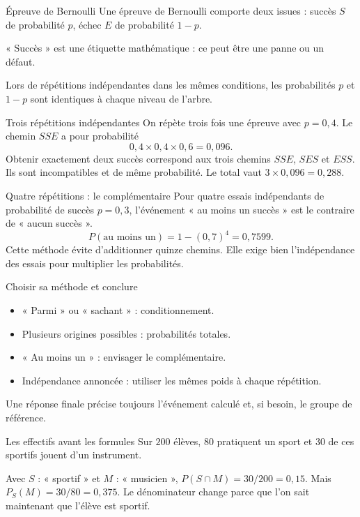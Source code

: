 \documentclass[aspectratio=169,12pt]{beamer}
\begin{document}
\renewcommand{\slidekind}{JUSTIFIER}
\begin{frame}[t,fragile]{Épreuve de Bernoulli}
Une épreuve de Bernoulli comporte deux issues : succès $S$ de probabilité $p$, échec $E$ de probabilité $1-p$.\medskip\par « Succès » est une étiquette mathématique : ce peut être une panne ou un défaut.\medskip\par Lors de répétitions indépendantes dans les mêmes conditions, les probabilités $p$ et $1-p$ sont identiques à chaque niveau de l’arbre.
\end{frame}
\renewcommand{\slidekind}{COMPRENDRE}
\begin{frame}[t,fragile]{Trois répétitions indépendantes}
On répète trois fois une épreuve avec $p=0,4$. Le chemin $SSE$ a pour probabilité\[0,4\times0,4\times0,6=0,096.\]Obtenir exactement deux succès correspond aux trois chemins $SSE$, $SES$ et $ESS$. Ils sont incompatibles et de même probabilité. Le total vaut $3\times0,096=0,288$.
\end{frame}
\renewcommand{\slidekind}{COMPRENDRE}
\begin{frame}[t,fragile]{Quatre répétitions : le complémentaire}
Pour quatre essais indépendants de probabilité de succès $p=0,3$, l’événement « au moins un succès » est le contraire de « aucun succès ».\[P(\text{au moins un})=1-(0,7)^4=0,7599.\]Cette méthode évite d’additionner quinze chemins. Elle exige bien l’indépendance des essais pour multiplier les probabilités.
\end{frame}
\renewcommand{\slidekind}{MÉTHODE \& EXEMPLE}
\begin{frame}[t,fragile]{Choisir sa méthode et conclure}
\begin{itemize}\item « Parmi » ou « sachant » : conditionnement.\item Plusieurs origines possibles : probabilités totales.\item « Au moins un » : envisager le complémentaire.\item Indépendance annoncée : utiliser les mêmes poids à chaque répétition.\end{itemize}Une réponse finale précise toujours l’événement calculé et, si besoin, le groupe de référence.
\end{frame}
\renewcommand{\slidekind}{COMPRENDRE}
\begin{frame}[t,fragile]{Les effectifs avant les formules}
Sur $200$ élèves, $80$ pratiquent un sport et $30$ de ces sportifs jouent d’un instrument.\medskip\par Avec $S$ : « sportif » et $M$ : « musicien », $P(S\cap M)=30/200=0,15$. Mais $P_S(M)=30/80=0,375$. Le dénominateur change parce que l’on sait maintenant que l’élève est sportif.
\end{frame}
\end{document}
